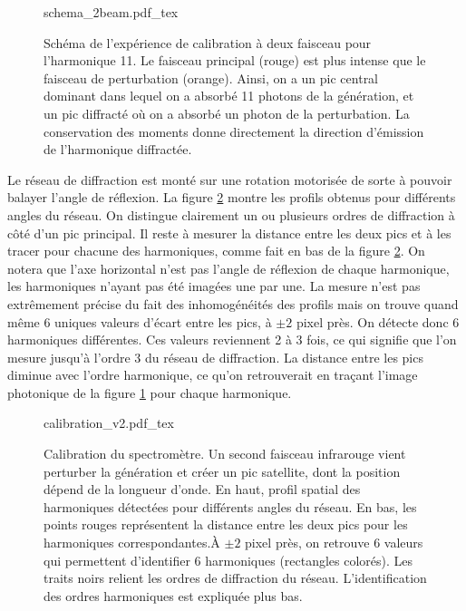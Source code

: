 \begin{figure}[!ht]
\centering
\def\svgwidth{\columnwidth}
{schema_2beam.pdf_tex}
\caption{Schéma de l'expérience de calibration à deux faisceau pour l'harmonique 11. Le faisceau principal (rouge) est plus intense que le faisceau de perturbation (orange). Ainsi, on a un pic central dominant dans lequel on a absorbé 11 photons de la génération, et un pic diffracté où on a absorbé un photon de la perturbation. La conservation des moments donne directement la direction d'émission de l'harmonique diffractée.}
\label{Fig:DiffSchema}
\end{figure}

Le réseau de diffraction est monté sur une rotation motorisée de sorte à pouvoir balayer l'angle de réflexion. La figure \ref{Fig:calibration} montre les profils obtenus pour différents angles du réseau. On distingue clairement un ou plusieurs ordres de diffraction à côté d'un pic principal. Il reste à mesurer la distance entre les deux pics et à les tracer pour chacune des harmoniques, comme fait en bas de la figure \ref{Fig:calibration}. On notera que l'axe horizontal n'est pas l'angle de réflexion de chaque harmonique, les harmoniques n'ayant pas été imagées une par une. La mesure n'est pas extrêmement précise du fait des inhomogénéités des profils mais on trouve quand même 6 uniques valeurs d'écart entre les pics, à $\pm 2$ pixel près. On détecte donc 6 harmoniques différentes. Ces valeurs reviennent 2 à 3 fois, ce qui signifie que l'on mesure jusqu'à l'ordre 3 du réseau de diffraction. La distance entre les pics diminue avec l'ordre harmonique, ce qu'on retrouverait en traçant l'image photonique de la figure \ref{Fig:DiffSchema} pour chaque harmonique.

\begin{figure}[!ht]
\centering
\def\svgwidth{\columnwidth}
{calibration_v2.pdf_tex}
\caption{Calibration du spectromètre. Un second faisceau infrarouge vient perturber la génération et créer un pic satellite, dont la position dépend de la longueur d'onde. En haut, profil spatial des harmoniques détectées pour différents angles du réseau. En bas, les points rouges représentent la distance entre les deux pics pour les harmoniques correspondantes.\`{A} $\pm2$ pixel près, on retrouve 6 valeurs qui permettent d'identifier 6 harmoniques (rectangles colorés). Les traits noirs relient les ordres de diffraction du réseau. L'identification des ordres harmoniques est expliquée plus bas.}
\label{Fig:calibration}
\end{figure}

